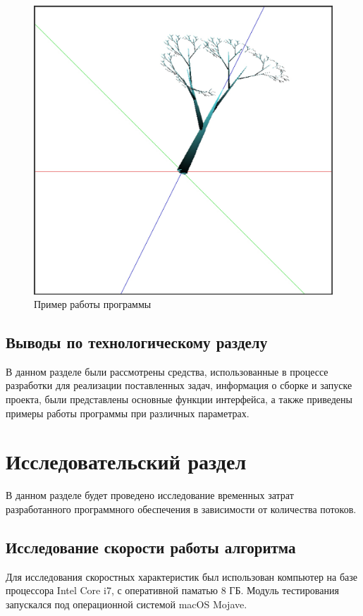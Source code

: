 \documentclass[54pt, a4paper]{article}
\begin{document}
\newpage

	\begin{figure}[ht!]
		\centering
		\includegraphics[scale=0.3]{img/ex5.JPG}
		\caption{Пример работы программы}
		\label{ris:ex5}
	\end{figure}

	\subsection{Выводы по технологическому разделу}
	В данном разделе были рассмотрены средства, использованные в процессе
	разработки для реализации поставленных задач, информация о сборке и запуске
	проекта, были представлены основные функции интерфейса, а также приведены
	примеры работы программы при различных параметрах.

	\newpage
	
	
	\section {Исследовательский раздел}
	В данном разделе будет проведено исследование временных затрат разработанного программного обеспечения в зависимости от количества потоков.
	\subsection{Исследование скорости работы алгоритма}
	Для исследования скоростных характеристик был использован компьютер на
	базе процессора Intel Core i7, с оперативной паматью 8 ГБ. Модуль
	тестирования запускался под операционной системой macOS Mojave.
	
\end{document}
